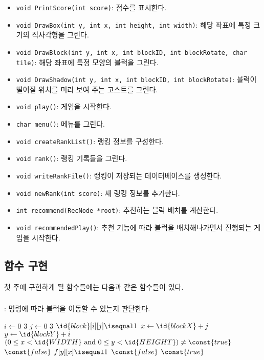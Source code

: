 \begin{itemize}
    \item \texttt{void PrintScore(int score)}: 점수를 표시한다.
    \item \texttt{void DrawBox(int y, int x, int height, int width)}: 해당 좌표에 특정 크기의 직사각형을 그린다.
    \item \texttt{void DrawBlock(int y, int x, int blockID, int blockRotate, char tile)}: 해당 좌표에 특정 모양의 블럭을 그린다.
    \item \texttt{void DrawShadow(int y, int x, int blockID, int blockRotate)}: 블럭이 떨어질 위치를 미리 보여 주는 고스트를 그린다.
    \item \texttt{void play()}: 게임을 시작한다.
    \item \texttt{char menu()}: 메뉴를 그린다.
    \item \texttt{void createRankList()}: 랭킹 정보를 구성한다.
    \item \texttt{void rank()}: 랭킹 기록들을 그린다.
    \item \texttt{void writeRankFile()}: 랭킹이 저장되는 데이터베이스를 생성한다.
    \item \texttt{void newRank(int score)}: 새 랭킹 정보를 추가한다.
    \item \texttt{int recommend(RecNode *root)}: 추천하는 블럭 배치를 계산한다.
    \item \texttt{void recommendedPlay()}: 추천 기능에 따라 블럭을 배치해나가면서 진행되는 게임을 시작한다.
\end{itemize}

\newpage

\subsection{함수 구현}
첫 주에 구현하게 될 함수들에는 다음과 같은 함수들이 있다.

\subsubsection{}: 명령에 따라 블럭을 이동할 수 있는지 판단한다.

\begin{codebox}
\li \For $i \gets 0$ \To $3$
\li \Do
        \For $j \gets 0$ \To $3$
\li     \Do
            \If $\id{block}[i][j] \isequal 1$
\li         \Then
                $x \gets \id{blockX} + j$
\li             $y \gets \id{blockY} + i$
\li             \If $\left( 0 \leq x < \id{WIDTH} \mbox{ and } 0 \leq y < \id{HEIGHT} \right) \neq \const{true}$
\li                 \Then \Return $\const{false}$
                \End
\li             \If $f[y][x] \isequal 1$
\li                 \Then \Return $\const{false}$
                \End
            \End
        \End
    \End
\li \Return $\const{true}$
\end{codebox}


